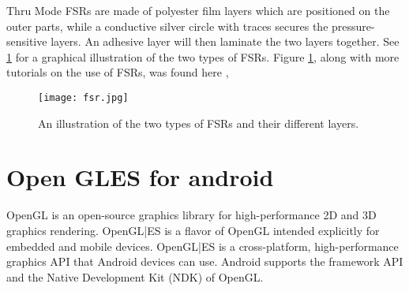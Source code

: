 Thru Mode FSRs are made of polyester film layers which are positioned on the outer parts, while a conductive silver circle with traces secures the pressure-sensitive layers. An adhesive layer will then laminate the two layers together. See \ref{fig:fsr} for a graphical illustration of the two types of FSRs. Figure \ref{fig:fsr}, along with more tutorials on the use of FSRs, was found here \cite{tekscan2022}, \cite{gigiseeedstudio2020}

\begin{figure}[!h]
    \centering
    \texttt{[image: fsr.jpg]}
    \caption{An illustration of the two types of FSRs and their different layers.}
    \label{fig:fsr}
\end{figure}


\section{Open GLES for android}
\label{sec:OpenGL}
OpenGL is an open-source graphics library for high-performance 2D and 3D graphics rendering. OpenGL|ES is a flavor of OpenGL intended explicitly for embedded and mobile devices. OpenGL|ES is a cross-platform, high-performance graphics API that Android devices can use. Android supports the framework API and the Native Development Kit (NDK) of OpenGL.  

